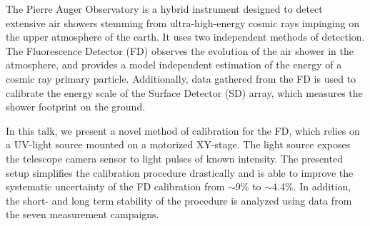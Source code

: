 \documentclass{scdpg}
\begin{document}
\begin{scAbstract}
\scBeginText
The Pierre Auger Observatory is a hybrid instrument designed to detect extensive air showers stemming from ultra-high-energy cosmic rays impinging on the upper atmosphere of the earth. It uses two independent methods of detection. The Fluorescence Detector (FD) observes the evolution of the air shower in the atmosphere, and provides a model independent estimation of the energy of a cosmic ray primary particle. Additionally, data gathered from the FD is used to calibrate the energy scale of the Surface Detector (SD) array, which measures the shower footprint on the ground.

In this talk, we present a novel method of calibration for the FD, which relies on a UV-light source mounted on a motorized XY-stage. The light source exposes the telescope camera sensor to light pulses of known intensity. The presented setup simplifies the calibration procedure drastically and is able to improve the systematic uncertainty of the FD calibration from $\sim9\%$ to $\sim4.4\%$. In addition, the short- and long term stability of the procedure is analyzed using data from the seven measurement campaigns.
\scEndText
{}
\end{scAbstract}
\end{document}
